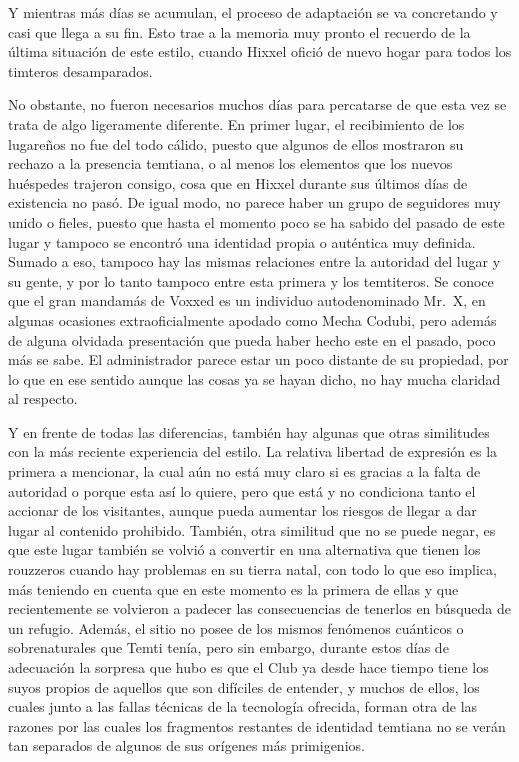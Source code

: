 \documentclass[
]{book}
\begin{document}
Y mientras más días se acumulan, el proceso de adaptación se va concretando y casi que llega a su fin. Esto trae a la memoria muy pronto el recuerdo de la última situación de este estilo, cuando Hixxel ofició de nuevo hogar para todos los timteros desamparados.

No obstante, no fueron necesarios muchos días para percatarse de que esta vez se trata de algo ligeramente diferente. En primer lugar, el recibimiento de los lugareños no fue del todo cálido, puesto que algunos de ellos mostraron su rechazo a la presencia temtiana, o al menos los elementos que los nuevos huéspedes trajeron consigo, cosa que en Hixxel durante sus últimos días de existencia no pasó. De igual modo, no parece haber un grupo de seguidores muy unido o fieles, puesto que hasta el momento poco se ha sabido del pasado de este lugar y tampoco se encontró una identidad propia o auténtica muy definida. Sumado a eso, tampoco hay las mismas relaciones entre la autoridad del lugar y su gente, y por lo tanto tampoco entre esta primera y los temtiteros. Se conoce que el gran mandamás de Voxxed es un individuo autodenominado Mr.~X, en algunas ocasiones extraoficialmente apodado como Mecha Codubi, pero además de alguna olvidada presentación que pueda haber hecho este en el pasado, poco más se sabe. El administrador parece estar un poco distante de su propiedad, por lo que en ese sentido aunque las cosas ya se hayan dicho, no hay mucha claridad al respecto.

Y en frente de todas las diferencias, también hay algunas que otras similitudes con la más reciente experiencia del estilo. La relativa libertad de expresión es la primera a mencionar, la cual aún no está muy claro si es gracias a la falta de autoridad o porque esta así lo quiere, pero que está y no condiciona tanto el accionar de los visitantes, aunque pueda aumentar los riesgos de llegar a dar lugar al contenido prohibido. También, otra similitud que no se puede negar, es que este lugar también se volvió a convertir en una alternativa que tienen los rouzzeros cuando hay problemas en su tierra natal, con todo lo que eso implica, más teniendo en cuenta que en este momento es la primera de ellas y que recientemente se volvieron a padecer las consecuencias de tenerlos en búsqueda de un refugio. Además, el sitio no posee de los mismos fenómenos cuánticos o sobrenaturales que Temti tenía, pero sin embargo, durante estos días de adecuación la sorpresa que hubo es que el Club ya desde hace tiempo tiene los suyos propios de aquellos que son difíciles de entender, y muchos de ellos, los cuales junto a las fallas técnicas de la tecnología ofrecida, forman otra de las razones por las cuales los fragmentos restantes de identidad temtiana no se verán tan separados de algunos de sus orígenes más primigenios.
\end{document}

